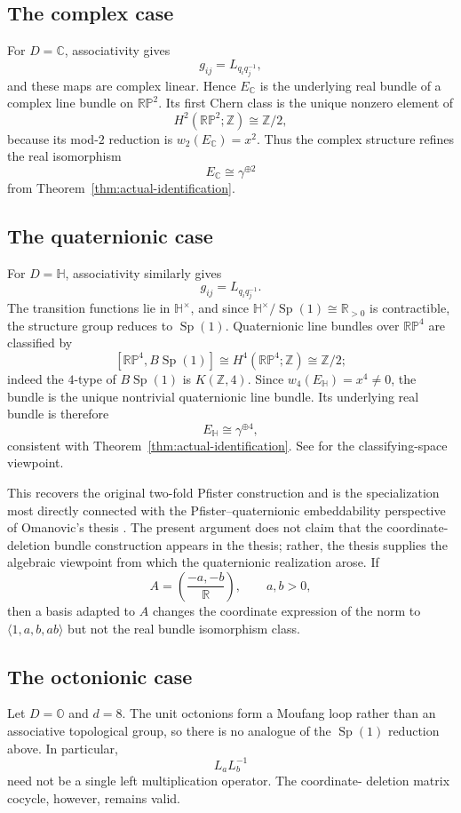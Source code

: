 \documentclass[12pt]{article}
\theoremstyle{plain}
\theoremstyle{definition}
\newcommand{\R}{\mathbb R}
\newcommand{\C}{\mathbb C}
\newcommand{\Hh}{\mathbb H}
\newcommand{\Oct}{\mathbb O}
\newcommand{\RP}{\mathbb{RP}}
\newcommand{\Sp}{\operatorname{Sp}}
\begin{document}
\subsection{The complex case}

For $D=\C$, associativity gives
\[
g_{ij}=L_{q_iq_j^{-1}},
\]
and these maps are complex linear. Hence $E_{\C}$ is the underlying
real bundle of a complex line bundle on $\RP^2$. Its first Chern class
is the unique nonzero element of
\[
H^2(\RP^2;\mathbb Z)\cong\mathbb Z/2,
\]
because its mod-$2$ reduction is
$w_2(E_{\C})=x^2$. Thus the complex structure refines the real
isomorphism
\[
E_{\C}\cong\gamma^{\oplus2}
\]
from Theorem~\ref{thm:actual-identification}.

\subsection{The quaternionic case}

For $D=\Hh$, associativity similarly gives
\[
g_{ij}=L_{q_iq_j^{-1}}.
\]
The transition functions lie in $\Hh^\times$, and since
$\Hh^\times/\Sp(1)\cong\R_{>0}$ is contractible, the structure group
reduces to $\Sp(1)$. Quaternionic line bundles over $\RP^4$ are
classified by
\[
[\RP^4,B\Sp(1)]\cong H^4(\RP^4;\mathbb Z)\cong\mathbb Z/2;
\]
indeed the $4$-type of $B\Sp(1)$ is $K(\mathbb Z,4)$. Since
$w_4(E_{\Hh})=x^4\ne0$, the bundle is the unique nontrivial
quaternionic line bundle. Its underlying real bundle is therefore
\[
E_{\Hh}\cong\gamma^{\oplus4},
\]
consistent with Theorem~\ref{thm:actual-identification}. See
\cite{Hatcher,CrowleyGoette} for the classifying-space viewpoint.

This recovers the original two-fold Pfister construction and is the
specialization most directly connected with the Pfister--quaternionic
embeddability perspective of Omanovic's thesis \cite{OmanovicThesis}. The
present argument does not claim that the coordinate-deletion bundle construction
appears in the thesis; rather, the thesis supplies the algebraic viewpoint from
which the quaternionic realization arose. If
\[
A=\left(\frac{-a,-b}{\R}\right),\qquad a,b>0,
\]
then a basis adapted to $A$ changes the coordinate expression of the
norm to $\langle1,a,b,ab\rangle$ but not the real bundle isomorphism
class.

\subsection{The octonionic case}

Let $D=\Oct$ and $d=8$. The unit octonions form a Moufang loop rather
than an associative topological group, so there is no analogue of the
$\Sp(1)$ reduction above. In particular,
\[
L_aL_b^{-1}
\]
need not be a single left multiplication operator. The coordinate-
deletion matrix cocycle, however, remains valid.
\end{document}
